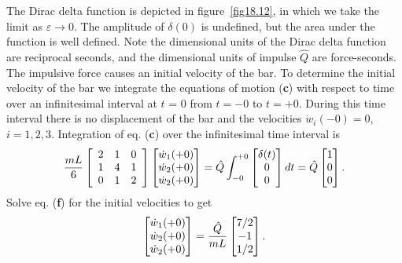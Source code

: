 \documentclass{AeroStructure-ERJohnson}
\begin{document}
\begin{example*}
\vspace*{-1pc}

\noindent The Dirac delta function is depicted in figure~\ref{fig18.12}, in which we take the limit as $\varepsilon \rightarrow 0$. The amplitude of $\delta(0)$ is undefined, but the area under the function is well defined. Note the dimensional units of the Dirac delta function are reciprocal seconds, and the dimensional units of impulse $\hat{Q}$ are force-seconds. The impulsive force causes an initial velocity of the bar. To determine the initial velocity of the bar we integrate the equations of motion (\textbf{c}) with respect to time over an infinitesimal interval at $t$ = 0 from $t=-0$ to $t=+0$. During this time interval there is no displacement of the bar and the velocities $\dot{w}_{i}(-0)=0$, $i=1,2,3$. Integration of eq. (\textbf{c}) over the infinitesimal time interval is
\begin{align}\label{ex18.2f}
\frac{m L}{6}\left[\begin{array}{lll}2 & 1 & 0 \\1 & 4 & 1 \\0 & 1 & 2\end{array}\right]\left[\begin{array}{@{}c@{}}\dot{w}_{1}(+0) \\\dot{w}_{2}(+0) \\\dot{w}_{2}(+0)\end{array}\right]=\hat{Q} \int_{-0}^{+0}\left[\begin{array}{@{}c@{}}\delta(t) \\0 \\0\end{array}\right] d t=\hat{Q}\left[\begin{array}{@{}l@{}}1 \\0 \\0\end{array}\right].
\end{align}
Solve eq. (\textbf{f}) for the initial velocities to get
\begin{align}\label{ex18.2g}
\left[\begin{array}{@{}c@{}}\dot{w}_{1}(+0) \\\dot{w}_{2}(+0) \\\dot{w}_{2}(+0)\end{array}\right]=\frac{\hat{Q}}{m L}\left[\begin{array}{@{}c@{}}7/2 \\-1 \\1/2\end{array}\right].
\end{align}


\end{example*}
\end{document}
